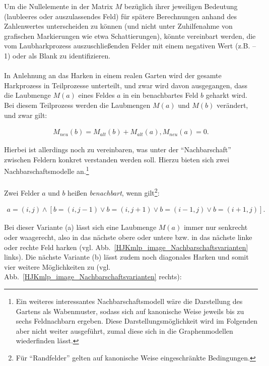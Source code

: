 \documentclass[fontsize=12pt,doubleside,openany,listof=totoc,listof=flat,listof=nochaptergap,numbers=noenddot]{scrbook}
\theoremstyle{style}
\begin{document}
\noindent Um die Nullelemente in der Matrix $M$ bezüglich ihrer jeweiligen Bedeutung 
(laubleeres oder auszulassendes Feld) für spätere Berechnungen anhand des 
Zahlenwertes unterscheiden zu können (und nicht unter Zuhilfenahme von grafischen 
Markierungen wie etwa Schattierungen), könnte vereinbart werden, die vom 
Laubharkprozess auszuschließenden Felder mit einem negativen Wert (z.B. –1) oder 
als Blank zu identifizieren.  
\\ \\
In Anlehnung an das Harken in einem realen Garten wird der gesamte Harkprozess in 
Teilprozesse unterteilt, und zwar wird davon ausgegangen, dass die Laubmenge
$M(a)$ eines Feldes $a$ in ein benachbartes Feld $b$ geharkt wird. Bei diesem
Teilprozess werden die Laubmengen $M(a)$ und $M(b)$ verändert, und zwar
gilt:

\begin{align}
M_{neu}(b)=M_{alt}(b)+M_{alt}(a), M_{neu}(a)= 0.
\label{HJKmlp_equation_Formel3}
\end{align}

\noindent Hierbei ist allerdings noch zu vereinbaren, was unter der "`Nachbarschaft"'
zwischen Feldern\label{benachbarte Felder} konkret verstanden werden soll. Hierzu bieten sich zwei Nachbarschaftsmodelle an.\footnote{Ein weiteres interessantes Nachbarschaftsmodell wäre die Darstellung des Gartens als Wabenmuster, sodass sich auf kanonische Weise jeweils bis zu sechs Feldnachbarn ergeben. Diese Darstellungsmöglichkeit wird im Folgenden aber nicht weiter ausgeführt, zumal diese sich in die Graphenmodellen wiederfinden lässt.} 
\\ \\
Zwei Felder $a$ und $b$ heißen \textit{benachbart}, wenn gilt\footnote{Für "`Randfelder"' gelten auf kanonische Weise eingeschränkte Bedingungen.}:

\begin{align}
   a=(i,j) \wedge [b=(i,j-1) \vee b=(i,j+1) \vee b=(i-1,j) \vee
   b=(i+1,j)].\label{HJKmlp_equation_Formel4}
\end{align}

\noindent Bei dieser Variante (a) lässt sich eine Laubmenge $M(a)$ immer nur senkrecht
oder waagerecht, also in das nächste obere oder untere bzw. in das nächste linke oder 
rechte Feld harken (vgl. Abb.~\ref{HJKmlp_image_Nachbarschaftsvarianten} links). Die nächste Variante (b) lässt zudem noch diagonales Harken und somit vier weitere Möglichkeiten zu (vgl. Abb.~\ref{HJKmlp_image_Nachbarschaftsvarianten}
rechts):
\end{document}
